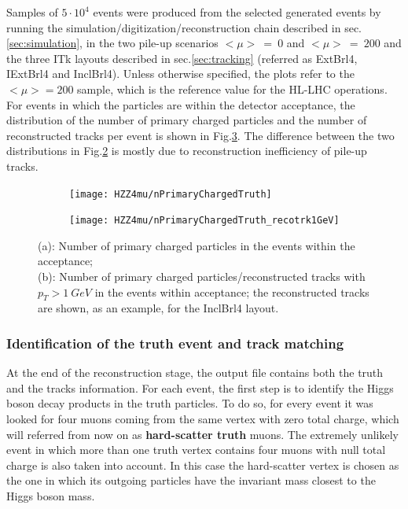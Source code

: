 \documentclass[a4paper,twoside,12pt]{article}
\begin{document}
Samples of $5 \cdot 10^4$ events were produced from the selected generated events by running
the simulation/digitization/reconstruction chain described in sec.\ref{sec:simulation}, in the
two pile-up scenarios  $<\mu>\ =\ 0$ and $<\mu>\ =\ 200$ and the three ITk layouts described in sec.\ref{sec:tracking} 
(referred as ExtBrl4, IExtBrl4 and InclBrl4). Unless otherwise specified, the plots refer to the $<\mu> = 200$ sample, which is the reference
value for the HL-LHC operations. For events in which the particles are within the detector acceptance, the distribution of
the number of primary charged particles and the number of reconstructed tracks per event is shown in
Fig.\ref{fig:HZZ4mu:nTracks}. The difference between the two distributions in Fig.\ref{fig:HZZ4mu:nPrimaryChargedTruth_recotrk1GeV} is
mostly due to reconstruction inefficiency of pile-up tracks.

\begin{figure}
\begin{subfigure}{.5\linewidth}
\texttt{[image: HZZ4mu/nPrimaryChargedTruth]}
\caption{ }
\label{fig:HZZ4mu:nPrimaryChargedTruth}
\end{subfigure}
\begin{subfigure}{.5\linewidth}
\texttt{[image: HZZ4mu/nPrimaryChargedTruth\_recotrk1GeV]}
\caption{ }
\label{fig:HZZ4mu:nPrimaryChargedTruth_recotrk1GeV}
\end{subfigure}
\caption{(a): Number of primary charged particles in the events within the acceptance;\\
                  (b): Number of primary charged particles/reconstructed tracks with $p_{T} > 1\ GeV$ in the events within acceptance; the reconstructed tracks are shown, as an example, for the InclBrl4 layout.}
\label{fig:HZZ4mu:nTracks}
\end{figure}

\subsubsection*{Identification of the truth event and track matching}
At the end of the reconstruction stage, the output file contains both the truth and the tracks information. For
each event, the first step is to identify the Higgs boson decay products in the truth particles.
To do so, for every event it was looked for four muons coming from the same vertex with zero total charge, which
will referred from now on as \textbf{hard-scatter truth} muons. The extremely unlikely event in which more
than one truth vertex contains four muons with null total charge is also taken into account. In this case 
the hard-scatter vertex is chosen as the one in which its outgoing particles have the invariant mass closest to the Higgs boson mass.\\
\end{document}
